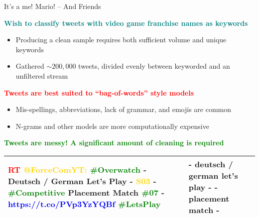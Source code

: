 \documentclass[aspectratio=169]{beamer}
\begin{document}
\begin{frame}{It's a me!  Mario! -- And Friends}
  \begin{center}
    \textcolor{teal}{\bf Wish to classify tweets with video game
      franchise names as keywords}
  \end{center}

  \begin{itemize}
    \item Producing a clean sample requires both sufficient volume and
      unique keywords
    \item Gathered $\sim 200,000$ tweets, divided evenly between
      keyworded and an unfiltered stream
  \end{itemize}

  \begin{center}
    \textcolor{red}{\bf Tweets are best suited to ``bag-of-words''
      style models}
  \end{center}

  \begin{itemize}
  \item Mis-spellings, abbreviations, lack of grammar, and emojis
    are common
  \item N-grams and other models are more computationally expensive
  \end{itemize}

  \begin{center}
    \textcolor{green}{\bf Tweets are messy! A significant amount of cleaning
      is required}
  \end{center}

  \begin{tabular}{|p{6cm}|p{6cm}|}
    \hline {\small \textcolor{red}{RT}  \textcolor{gold}{@ForceComYT:}
      \textcolor{green}{\#Overwatch} - Deutsch / German Let's Play -
      \textcolor{gold}{S03} - \textcolor{green}{\#Competitive} Placement
      Match \textcolor{green}{\#07} -
      \textcolor{blue}{https://t.co/PVp3YzYQBf}
      \textcolor{green}{\#LetsPlay}} & {\small - deutsch / german let's play
      - - placement match -} \\ \hline
  \end{tabular}

\end{frame}
\end{document}
